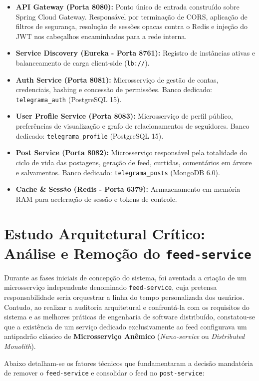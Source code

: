 \documentclass[12pt,a4paper]{report}
\begin{document}
\begin{itemize}
    \item \textbf{API Gateway (Porta 8080):} Ponto único de entrada construído sobre Spring Cloud Gateway. Responsável por terminação de CORS, aplicação de filtros de segurança, resolução de sessões opacas contra o Redis e injeção do JWT nos cabeçalhos encaminhados para a rede interna.
    \item \textbf{Service Discovery (Eureka - Porta 8761):} Registro de instâncias ativas e balanceamento de carga client-side (\texttt{lb://}).
    \item \textbf{Auth Service (Porta 8081):} Microsserviço de gestão de contas, credenciais, hashing e concessão de permissões. Banco dedicado: \texttt{telegrama\_auth} (PostgreSQL 15).
    \item \textbf{User Profile Service (Porta 8083):} Microsserviço de perfil público, preferências de visualização e grafo de relacionamentos de seguidores. Banco dedicado: \texttt{telegrama\_profile} (PostgreSQL 15).
    \item \textbf{Post Service (Porta 8082):} Microsserviço responsável pela totalidade do ciclo de vida das postagens, geração de feed, curtidas, comentários em árvore e salvamentos. Banco dedicado: \texttt{telegrama\_posts} (MongoDB 6.0).
    \item \textbf{Cache \& Sessão (Redis - Porta 6379):} Armazenamento em memória RAM para aceleração de sessão e tokens de controle.
\end{itemize}

\section{Estudo Arquitetural Crítico: Análise e Remoção do \texttt{feed-service}}

Durante as fases iniciais de concepção do sistema, foi aventada a criação de um microsserviço independente denominado \texttt{feed-service}, cuja pretensa responsabilidade seria orquestrar a linha do tempo personalizada dos usuários. Contudo, ao realizar a auditoria arquitetural e confrontá-la com os requisitos do sistema e as melhores práticas de engenharia de software distribuído, constatou-se que a existência de um serviço dedicado exclusivamente ao feed configurava um antipadrão clássico de \textbf{Microsserviço Anêmico} (\textit{Nano-service} ou \textit{Distributed Monolith}).

Abaixo detalham-se os fatores técnicos que fundamentaram a decisão mandatória de remover o \texttt{feed-service} e consolidar o feed no \texttt{post-service}:
\end{document}
